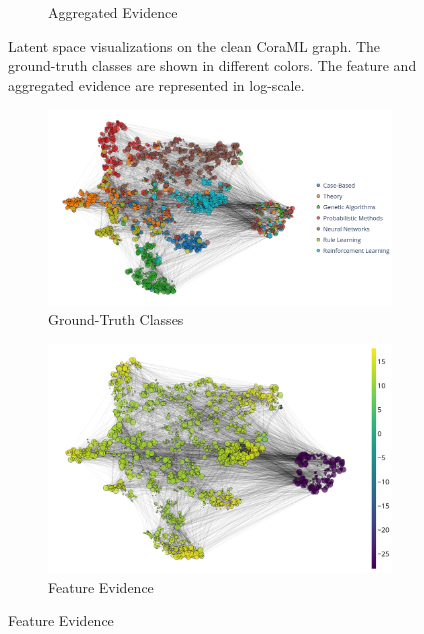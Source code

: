 \begin{figure}[!h]
\begin{subfigure}[t]{\textwidth}
		\caption{Aggregated Evidence}
		\label{subfig:latent-clean-evidence}
	\end{subfigure}
    \caption{Latent space visualizations on the clean CoraML graph. The ground-truth classes are shown in different colors. The feature and aggregated evidence are represented in log-scale.}
    \label{fig:latent-space-clean}
\end{figure}
%
\begin{figure}[!h]
    \centering
	\begin{subfigure}[t]{\textwidth}
	    \centering
		\includegraphics[height=0.25\textheight]{resources/gaussian-classes.png}
		\caption{Ground-Truth Classes} 
		\label{subfig:gaussian-clean-classes}
	\end{subfigure}
	\begin{subfigure}[t]{\textwidth}
	    \centering
		\includegraphics[height=0.25\textheight]{resources/gaussian-ft-evidence.png}
		\caption{Feature Evidence} 
		\label{subfig:gaussian-clean-feature-evidence}
	\end{subfigure}

\end{figure}
